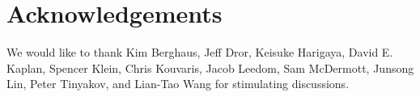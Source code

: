 \documentclass[preprintnumbers,amsmath,amssymb,prd,superscriptaddress]{revtex4}
\begin{document}
\section*{Acknowledgements}
We would like to thank Kim Berghaus, Jeff Dror, Keisuke Harigaya, David E. Kaplan, Spencer Klein, Chris Kouvaris, Jacob Leedom, Sam McDermott, Junsong Lin, Peter Tinyakov, and Lian-Tao Wang for stimulating discussions.

\begin{thebibliography}{99}


\end{thebibliography}
\end{document}
